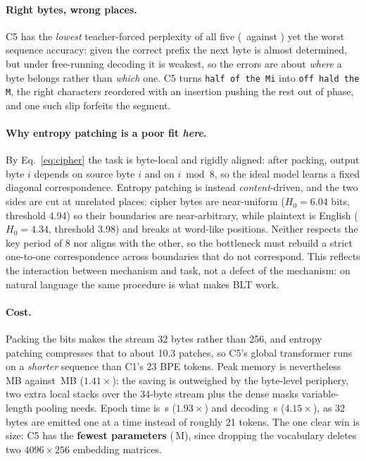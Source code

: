 \paragraph{Right bytes, wrong places.} C5 has the \emph{lowest} teacher-forced
perplexity of all five (\CfgFivePpl\ against \CfgOnePpl) yet the worst sequence
accuracy: given the correct prefix the next byte is almost determined, but under
free-running decoding it is weakest, so the errors are about \emph{where} a byte
belongs rather than \emph{which} one. C5 turns \texttt{half of the Mi} into
\texttt{off hald the M}, the right characters reordered with an insertion pushing
the rest out of phase, and one such slip forfeits the segment.

\paragraph{Why entropy patching is a poor fit \emph{here}.} By
Eq.~\ref{eq:cipher} the task is byte-local and rigidly aligned: after packing,
output byte $i$ depends on source byte $i$ and on $i \bmod 8$, so the ideal model
learns a fixed diagonal correspondence. Entropy patching is instead
\emph{content}-driven, and the two sides are cut at unrelated places: cipher
bytes are near-uniform ($H_0 = 6.04$ bits, threshold 4.94) so their boundaries
are near-arbitrary, while plaintext is English ($H_0 = 4.34$, threshold 3.98) and
breaks at word-like positions. Neither respects the key period of 8 nor aligns
with the other, so the bottleneck must rebuild a strict one-to-one correspondence
across boundaries that do not correspond. This reflects the interaction between
mechanism and task, not a defect of the mechanism: on natural language the same
procedure is what makes BLT work.

\paragraph{Cost.} Packing the bits makes the stream 32 bytes rather than 256, and
entropy patching compresses that to about 10.3 patches, so C5's global
transformer runs on a \emph{shorter} sequence than C1's 23 BPE tokens. Peak memory
is nevertheless \CfgFiveMem\,MB against \CfgOneMem\,MB ($1.41\times$): the saving
is outweighed by the byte-level periphery, two extra local stacks over the
34-byte stream plus the dense masks variable-length pooling needs. Epoch time is
\CfgFiveSec\,s ($1.93\times$) and decoding \CfgFiveGen\,s ($4.15\times$), as 32
bytes are emitted one at a time instead of roughly 21 tokens. The one clear win is
size: C5 has the \textbf{fewest parameters} (\CfgFivePar\,M), since dropping the
vocabulary deletes two $4096 \times 256$ embedding matrices.

